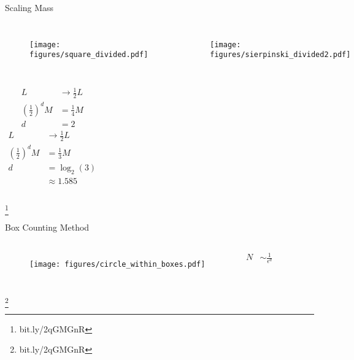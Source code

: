 \documentclass[10pt]{beamer}
\newcommand\blfootnote[1]{%
  \begingroup
  \renewcommand\thefootnote{}\footnote{#1}%
  \addtocounter{footnote}{-1}%
  \endgroup
}
\begin{document}
\begin{frame}{Scaling Mass}
    \begin{columns}[c]
        \column{1.5in}
        \begin{figure}[h!]
            \centering
            \texttt{[image: figures/square\_divided.pdf]}
        \end{figure}
    \column{1.5in}
        \begin{figure}[h!]
            \centering
            \texttt{[image: figures/sierpinski\_divided2.pdf]}
        \end{figure}
    \end{columns}
    \begin{columns}[c]
        \column{1.5in}
            \begin{align*}
                L &\rightarrow \frac{1}{2} L \\
                \left (\frac{1}{2} \right )^d M &= \frac{1}{4} M \\
                d &= 2
            \end{align*}
        \column{1.5in}
            \begin{align*}
                L &\rightarrow \frac{1}{2} L \\
                \left (\frac{1}{2} \right )^d M &= \frac{1}{3} M \\
                d &= \log_2 (3) \\ &\approx 1.585
            \end{align*}
    \end{columns}
    \blfootnote{bit.ly/2qGMGnR}
\end{frame}

\begin{frame}{Box Counting Method}
    \begin{columns}[c]
        \column{1.5in}
        \begin{figure}[h!]
            \centering
            \texttt{[image: figures/circle\_within\_boxes.pdf]}
        \end{figure}
        \column{1.5in}
            \begin{align*}
                N &\sim \frac{1}{\epsilon^d} \\
            \end{align*}
    \end{columns}
    \blfootnote{bit.ly/2qGMGnR}
\end{frame}
\end{document}
